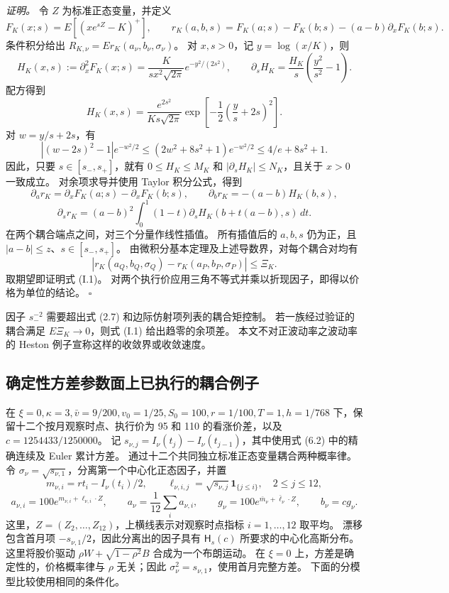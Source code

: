 \textit{证明。}
令 \(Z\) 为标准正态变量，并定义
\[
F_K(x;s)=E[(xe^{sZ}-K)^+],\qquad
r_K(a,b,s)=F_K(a;s)-F_K(b;s)-(a-b)\partial_xF_K(b;s).
\]
条件积分给出 \(R_{K,\nu}=E r_K(a_\nu,b_\nu,\sigma_\nu)\)。
对 \(x,s>0\)，记 \(y=\log(x/K)\)，则
\[
H_K(x,s):=\partial_x^2F_K(x;s)
=\frac{K}{s x^2\sqrt{2\pi}}e^{-y^2/(2s^2)},\qquad
\partial_sH_K=\frac{H_K}{s}\left(\frac{y^2}{s^2}-1\right).
\]
配方得到
\[
H_K(x,s)=\frac{e^{2s^2}}{K s\sqrt{2\pi}}
\exp\left[-\frac12\left(\frac ys+2s\right)^2\right].
\]
对 \(w=y/s+2s\)，有
\[
\left|(w-2s)^2-1\right|e^{-w^2/2}
\le(2w^2+8s^2+1)e^{-w^2/2}
\le 4/e+8s^2+1.
\]
因此，只要 \(s\in[s_-,s_+]\)，就有
\(0\le H_K\le M_K\) 和 \(|\partial_sH_K|\le N_K\)，且关于
\(x>0\) 一致成立。
对余项求导并使用 Taylor 积分公式，得到
\[
\partial_a r_K=\partial_xF_K(a;s)-\partial_xF_K(b;s),\qquad
\partial_b r_K=-(a-b)H_K(b,s),
\]
\[
\partial_s r_K=(a-b)^2\int_0^1(1-t)
       \partial_sH_K(b+t(a-b),s)\,dt.
\]
在两个耦合端点之间，对三个分量作线性插值。
所有插值后的 \(a,b,s\) 仍为正，且
\(|a-b|\le z\)、\(s\in[s_-,s_+]\)。
由微积分基本定理及上述导数界，对每个耦合对均有
\[
|r_K(a_Q,b_Q,\sigma_Q)-r_K(a_P,b_P,\sigma_P)|\le\Xi_K.
\]
取期望即证明式 (I.1)。
对两个执行价应用三角不等式并乘以折现因子，即得以价格为单位的结论。
\hfill\(\square\)

因子 \(s_-^{-2}\) 需要超出式 (2.7) 和边际仿射项列表的耦合矩控制。
若一族经过验证的耦合满足 \(E\Xi_K\to0\)，则式 (I.1) 给出趋零的余项差。
本文不对正波动率之波动率的 Heston 例子宣称这样的收敛界或收敛速度。

\subsection{确定性方差参数面上已执行的耦合例子}

在 \(\xi=0,\kappa=3,\bar v=9/200,v_0=1/25,S_0=100,r=1/100,T=1,h=1/768\) 下，保留十二个按月观察时点、执行价为 95 和 110 的看涨价差，以及
\(c=1254433/1250000\)。
记
\(s_{\nu,j}=I_\nu(t_j)-I_\nu(t_{j-1})\)，其中使用式 (6.2) 中的精确连续及 Euler 累计方差。
通过十二个共同独立标准正态变量耦合两种概率律。
令 \(\sigma_\nu=\sqrt{s_{\nu,1}}\)，分离第一个中心化正态因子，并置
\[
m_{\nu,i}=rt_i-I_\nu(t_i)/2,\qquad
\ell_{\nu,i,j}=\sqrt{s_{\nu,j}}\mathbf1_{\{j\le i\}},\quad 2\le j\le12,
\]
\[
a_{\nu,i}=100e^{m_{\nu,i}+\ell_{\nu,i}\cdot Z},\qquad
a_\nu=\frac1{12}\sum_i a_{\nu,i},\qquad
g_\nu=100e^{\bar m_\nu+\bar\ell_\nu\cdot Z},\qquad b_\nu=cg_\nu.
\]
这里，\(Z=(Z_2,\ldots,Z_{12})\)，上横线表示对观察时点指标 \(i=1,\ldots,12\) 取平均。
漂移包含首月项 \(-s_{\nu,1}/2\)，因此分离出的因子具有 \(\mathsf H_s(c)\) 所要求的中心化高斯分布。
这里将股价驱动 \(\rho W+\sqrt{1-\rho^2}B\) 合成为一个布朗运动。
在 \(\xi=0\) 上，方差是确定性的，价格概率律与 \(\rho\) 无关；因此 \(\sigma_\nu^2=s_{\nu,1}\)，使用首月完整方差。
下面的分模型比较使用相同的条件化。

